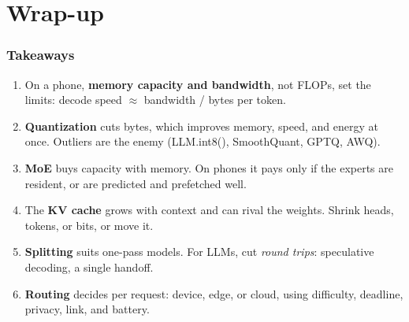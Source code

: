 
\section[Wrap-up]{Wrap-up}
\begin{frame}
\frametitle{Takeaways}
\vspace{4pt}
\begin{enumerate}\setlength{\itemsep}{5pt}
  \item On a phone, \textbf{memory capacity and bandwidth}, not FLOPs, set the limits: decode speed $\approx$ bandwidth / bytes per token.
  \item \textbf{Quantization} cuts bytes, which improves memory, speed, and energy at once. Outliers are the enemy (LLM.int8(), SmoothQuant, GPTQ, AWQ).
  \item \textbf{MoE} buys capacity with memory. On phones it pays only if the experts are resident, or are predicted and prefetched well.
  \item The \textbf{KV cache} grows with context and can rival the weights. Shrink heads, tokens, or bits, or move it.
  \item \textbf{Splitting} suits one-pass models. For LLMs, cut \emph{round trips}: speculative decoding, a single handoff.
  \item \textbf{Routing} decides per request: device, edge, or cloud, using difficulty, deadline, privacy, link, and battery.
\end{enumerate}
\end{frame}

